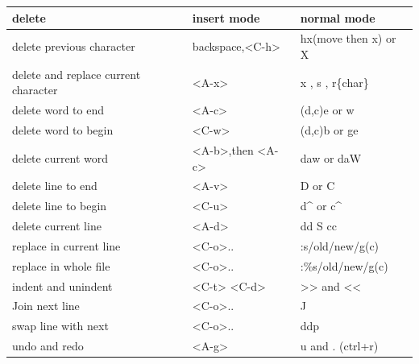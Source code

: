 \documentclass[paper=8.5in:11in, twoside, 12pt, pagesize=pdftex]{book}
\begin{document}
		\begin{center}
			\begin{tabular}{p{0.33\textwidth}|p{}|p{}}
				\hline
				delete & insert mode & normal mode\\
				
				\hline 
				delete previous character & backspace,<C-h> & hx(move then x) or X  \\
				
				\hline 
				delete and replace current character & <A-x> & x , s , r\{char\}  \\
				
				\hline 
				delete word to end & <A-c> & (d,c)e or w  \\
				
				\hline 
				delete word to begin & <C-w> &(d,c)b or ge  \\
				
				\hline 
				delete current word &<A-b>,then <A-c> & daw or daW \\
				
				\hline 
				delete line to end & <A-v> & D or C  \\
				
				\hline 
				delete line to begin & <C-u> & d\^{} or c\^{}  \\
				
				\hline 
				delete current line & <A-d> & dd S cc \\
				
				\hline
				replace in current line &<C-o>.. & :s/old/new/g(c) \\
				
				\hline 
				replace in whole file &<C-o>.. & :\%s/old/new/g(c) \\
				
				\hline
				indent and unindent & <C-t> <C-d> & >> and << \\
				
				\hline 
				Join next line & <C-o>.. & J \\ 
				
				\hline 
				swap line with next &<C-o>.. & ddp \\
				
				\hline 
				undo and redo & <A-g> &  u and . (ctrl+r) \\ 
				
			\end{tabular}
		\end{center}
		
\end{document}
